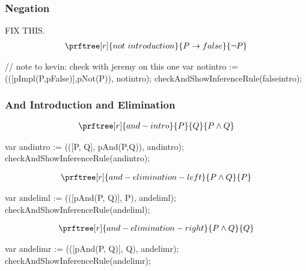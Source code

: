 \documentclass[letterpaper,10pt,english]{sphinxmanual}
\begin{document}
\subsubsection{Negation}
\label{\detokenize{13-consequence:negation}}
FIX THIS.
\begin{equation*}
\begin{split}\prftree[r]{not\ introduction}{P \rightarrow false}{\neg P}\end{split}
\end{equation*}
\begin{sphinxVerbatim}[commandchars=\\\{\}]
// note to kevin: check with jeremy on this one
var not\PYGZus{}intro := (([pImpl(P,pFalse)],pNot(P)), \PYGZdq{}not\PYGZus{}intro\PYGZdq{});
checkAndShowInferenceRule(false\PYGZus{}intro);
\end{sphinxVerbatim}


\subsubsection{And Introduction and Elimination}
\label{\detokenize{13-consequence:and-introduction-and-elimination}}\begin{equation*}
\begin{split}\prftree[r]{and-intro}{P}{Q}{P \land Q}\end{split}
\end{equation*}
\begin{sphinxVerbatim}[commandchars=\\\{\}]
var and\PYGZus{}intro   := (([P, Q], pAnd(P,Q)),        \PYGZdq{}and\PYGZus{}intro\PYGZdq{});
checkAndShowInferenceRule(and\PYGZus{}intro);
\end{sphinxVerbatim}
\begin{equation*}
\begin{split}\prftree[r]{and-elimination-left}{P \land Q}{P}\end{split}
\end{equation*}
\begin{sphinxVerbatim}[commandchars=\\\{\}]
var and\PYGZus{}elim\PYGZus{}l  := (([pAnd(P, Q)], P),          \PYGZdq{}and\PYGZus{}elim\PYGZus{}l\PYGZdq{});
checkAndShowInferenceRule(and\PYGZus{}elim\PYGZus{}l);
\end{sphinxVerbatim}
\begin{equation*}
\begin{split}\prftree[r]{and-elimination-right}{P \land Q}{Q}\end{split}
\end{equation*}
\begin{sphinxVerbatim}[commandchars=\\\{\}]
var and\PYGZus{}elim\PYGZus{}r  := (([pAnd(P, Q)], Q),          \PYGZdq{}and\PYGZus{}elim\PYGZus{}r\PYGZdq{});
checkAndShowInferenceRule(and\PYGZus{}elim\PYGZus{}r);
\end{sphinxVerbatim}
\end{document}
